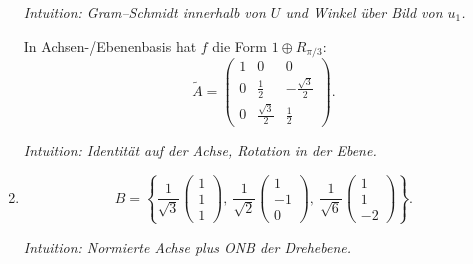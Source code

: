 \documentclass[11pt, a4paper]{article}
\begin{document}
\begin{enumerate}
  \medskip\noindent\textit{Intuition: Gram–Schmidt innerhalb von $U$ und Winkel über Bild von $u_1$.}

  In Achsen-/Ebenenbasis hat $f$ die Form $1\oplus R_{\pi/3}$:
  \[
  \tilde A=
  \begin{pmatrix}
  1&0&0\\
  0&\tfrac12&-\tfrac{\sqrt3}{2}\\
  0&\tfrac{\sqrt3}{2}&\tfrac12
  \end{pmatrix}.
  \]

  \medskip\noindent\textit{Intuition: Identität auf der Achse, Rotation in der Ebene.}

  \item
  \[
  B=\left\{
  \frac{1}{\sqrt3}\begin{pmatrix}1\\1\\1\end{pmatrix},\
  \frac{1}{\sqrt2}\begin{pmatrix}1\\-1\\0\end{pmatrix},\
  \frac{1}{\sqrt6}\begin{pmatrix}1\\1\\-2\end{pmatrix}
  \right\}.
  \]

  \medskip\noindent\textit{Intuition: Normierte Achse plus ONB der Drehebene.}
\end{enumerate}
\end{document}

